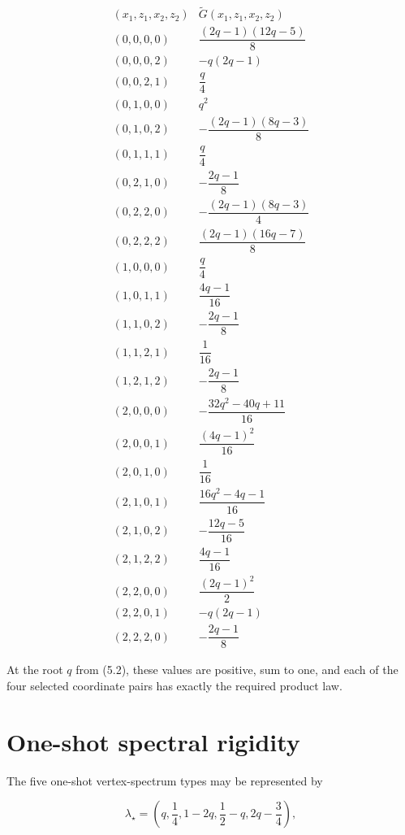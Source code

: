 \documentclass[11pt,a4paper]{article}
\newcommand{\1}{\mathbf 1}
\begin{document}
\[
\renewcommand{\arraystretch}{1.32}
\begin{array}{c|c}
(x_1,z_1,x_2,z_2) & \widetilde G(x_1,z_1,x_2,z_2)
\\
\hline
(0,0,0,0) & \dfrac{(2q-1)(12q-5)}8 \\
(0,0,0,2) & -q(2q-1) \\
(0,0,2,1) & \dfrac q4 \\
(0,1,0,0) & q^2 \\
(0,1,0,2) & -\dfrac{(2q-1)(8q-3)}8 \\
(0,1,1,1) & \dfrac q4 \\
(0,2,1,0) & -\dfrac{2q-1}{8} \\
(0,2,2,0) & -\dfrac{(2q-1)(8q-3)}4 \\
(0,2,2,2) & \dfrac{(2q-1)(16q-7)}8 \\
(1,0,0,0) & \dfrac q4 \\
(1,0,1,1) & \dfrac{4q-1}{16} \\
(1,1,0,2) & -\dfrac{2q-1}{8} \\
(1,1,2,1) & \dfrac1{16} \\
(1,2,1,2) & -\dfrac{2q-1}{8} \\
(2,0,0,0) & -\dfrac{32q^2-40q+11}{16} \\
(2,0,0,1) & \dfrac{(4q-1)^2}{16} \\
(2,0,1,0) & \dfrac1{16} \\
(2,1,0,1) & \dfrac{16q^2-4q-1}{16} \\
(2,1,0,2) & -\dfrac{12q-5}{16} \\
(2,1,2,2) & \dfrac{4q-1}{16} \\
(2,2,0,0) & \dfrac{(2q-1)^2}{2} \\
(2,2,0,1) & -q(2q-1) \\
(2,2,2,0) & -\dfrac{2q-1}{8}
\end{array}
\tag{A.1}
\]

At the root \(q\) from (5.2), these values are positive, sum to
one, and each of the four selected coordinate pairs has exactly the
required product law.


\section{One-shot spectral rigidity}
\label{app:rigidity}

The five one-shot vertex-spectrum types may be represented by

\[
\lambda_\star
=
\left(
q,\frac14,1-2q,\frac12-q,2q-\frac34
\right),
\]
\end{document}
